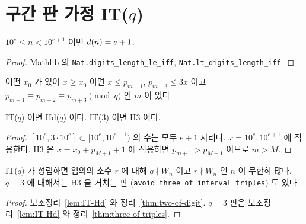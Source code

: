 \section{구간 판 가정 IT(\(q\))}

\begin{lemma}[자릿수 구간]
  \label{lem:digitsLen-eq}
  \leanok
  \(10^e \le n < 10^{e+1}\) 이면 \(d(n) = e + 1\).
\end{lemma}
\begin{proof}
  \leanok
  Mathlib 의 \texttt{Nat.digits\_length\_le\_iff}, \texttt{Nat.lt\_digits\_length\_iff}.
\end{proof}

\begin{definition}[가정 IT(\(q\))]
  \label{def:IT}
  \leanok
  어떤 \(x_0\) 가 있어 \(x \ge x_0\) 이면 \(x \le p_{m+1}\), \(p_{m+3} \le 3x\) 이고
  \(p_{m+1} \equiv p_{m+2} \equiv p_{m+3} \pmod q\) 인 \(m\) 이 있다.
\end{definition}

\begin{lemma}[IT(\(q\)) 에서 Hd(\(q\)), H3]
  \label{lem:IT-Hd}
  \leanok
  IT(\(q\)) 이면 Hd(\(q\)) 이다. IT(3) 이면 H3 이다.
\end{lemma}
\begin{proof}
  \leanok
  \([10^e, 3 \cdot 10^e] \subset [10^e, 10^{e+1})\) 의 수는 모두 \(e + 1\) 자리다. \(x = 10^e, 10^{e+1}\) 에 적용한다.
  H3 은 \(x = x_0 + p_{M+1} + 1\) 에 적용하면 \(p_{m+1} > p_{M+1}\) 이므로 \(m > M\).
\end{proof}

\begin{theorem}[IT(\(q\)) 에서 Q1, \(S = \{q, r\}\)]
  \label{thm:two-of-IT}
  \leanok
  IT(\(q\)) 가 성립하면 임의의 소수 \(r\) 에 대해 \(q \nmid W_n\) 이고 \(r \nmid W_n\) 인 \(n\) 이 무한히 많다.
  \(q = 3\) 에 대해서는 H3 을 거치는 판 (\texttt{avoid\_three\_of\_interval\_triples}) 도 있다.
\end{theorem}
\begin{proof}
  \leanok
  보조정리~\ref{lem:IT-Hd} 와 정리~\ref{thm:two-of-digit}. \(q = 3\) 판은 보조정리~\ref{lem:IT-Hd} 와 정리~\ref{thm:three-of-triples}.
\end{proof}

